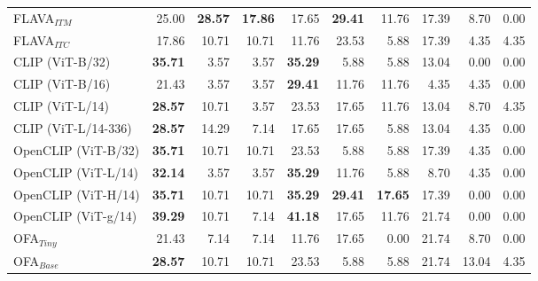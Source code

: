 \begin{table}[ht]
\begin{adjustbox}{max width=0.8\textwidth}
\begin{tabular}{l|rrr|rrr|rrr}
 FLAVA$_{ITM}$                       & 25.00          & \textbf{28.57} & \textbf{17.86} & 17.65          & \textbf{29.41} & 11.76          & 17.39          & 8.70           & 0.00           \\
 FLAVA$_{ITC}$                       & 17.86          & 10.71          & 10.71          & 11.76          & 23.53          & 5.88           & 17.39          & 4.35           & 4.35           \\
 CLIP (ViT-B/32)                     & \textbf{35.71} & 3.57           & 3.57           & \textbf{35.29} & 5.88           & 5.88           & 13.04          & 0.00           & 0.00           \\
 CLIP (ViT-B/16)                     & 21.43          & 3.57           & 3.57           & \textbf{29.41} & 11.76          & 11.76          & 4.35           & 4.35           & 0.00           \\
 CLIP (ViT-L/14)                     & \textbf{28.57} & 10.71          & 3.57           & 23.53          & 17.65          & 11.76          & 13.04          & 8.70           & 4.35           \\
 CLIP (ViT-L/14-336)                 & \textbf{28.57} & 14.29          & 7.14           & 17.65          & 17.65          & 5.88           & 13.04          & 4.35           & 0.00           \\
 OpenCLIP (ViT-B/32)            & \textbf{35.71} & 10.71          & 10.71          & 23.53          & 5.88           & 5.88           & 17.39          & 4.35           & 0.00           \\
 OpenCLIP (ViT-L/14)            & \textbf{32.14} & 3.57           & 3.57           & \textbf{35.29} & 11.76          & 5.88           & 8.70           & 4.35           & 0.00           \\
 OpenCLIP (ViT-H/14)            & \textbf{35.71} & 10.71          & 10.71          & \textbf{35.29} & \textbf{29.41} & \textbf{17.65} & 17.39          & 0.00           & 0.00           \\
 OpenCLIP (ViT-g/14)            & \textbf{39.29} & 10.71          & 7.14           & \textbf{41.18} & 17.65          & 11.76          & 21.74          & 0.00           & 0.00           \\
 OFA$_{Tiny}$                        & 21.43          & 7.14           & 7.14           & 11.76          & 17.65          & 0.00           & 21.74          & 8.70           & 0.00           \\
 OFA$_{Base}$                        & \textbf{28.57} & 10.71          & 10.71          & 23.53          & 5.88           & 5.88           & 21.74          & 13.04          & 4.35           \\

\end{tabular}
\end{adjustbox}
\end{table}
